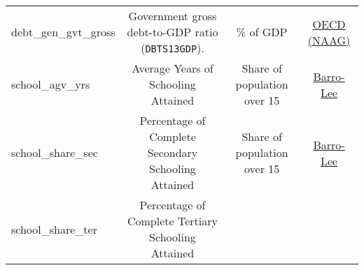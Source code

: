\documentclass[]{article}
\begin{document}
\begin{longtable}[]{@{}lccc@{}}
\begin{minipage}[t]{0.14\columnwidth}
debt\_gen\_gvt\_gross\strut
\end{minipage} & \begin{minipage}[t]{0.36\columnwidth}\centering\strut
Government gross debt-to-GDP ratio (\texttt{DBTS13GDP}).\strut
\end{minipage} & \begin{minipage}[t]{0.24\columnwidth}\centering\strut
\% of GDP\strut
\end{minipage} & \begin{minipage}[t]{0.15\columnwidth}\centering\strut
\href{https://stats.oecd.org/Index.aspx?DataSetCode=NAAG}{OECD
(NAAG)}\strut
\end{minipage}\tabularnewline
\begin{minipage}[t]{0.14\columnwidth}\raggedright\strut
school\_agv\_yrs\strut
\end{minipage} & \begin{minipage}[t]{0.36\columnwidth}\centering\strut
Average Years of Schooling Attained\strut
\end{minipage} & \begin{minipage}[t]{0.24\columnwidth}\centering\strut
Share of population over 15\strut
\end{minipage} & \begin{minipage}[t]{0.15\columnwidth}\centering\strut
\href{http://www.barrolee.com/}{Barro-Lee}\strut
\end{minipage}\tabularnewline
\begin{minipage}[t]{0.14\columnwidth}\raggedright\strut
school\_share\_sec\strut
\end{minipage} & \begin{minipage}[t]{0.36\columnwidth}\centering\strut
Percentage of Complete Secondary Schooling Attained\strut
\end{minipage} & \begin{minipage}[t]{0.24\columnwidth}\centering\strut
Share of population over 15\strut
\end{minipage} & \begin{minipage}[t]{0.15\columnwidth}\centering\strut
\href{http://www.barrolee.com/}{Barro-Lee}\strut
\end{minipage}\tabularnewline
\begin{minipage}[t]{0.14\columnwidth}\raggedright\strut
school\_share\_ter\strut
\end{minipage} & \begin{minipage}[t]{0.36\columnwidth}\centering\strut
Percentage of Complete Tertiary Schooling Attained\strut
\end{minipage} & \begin{minipage}[t]{0.24\columnwidth}\centering\strut

\end{minipage}
\end{longtable}
\end{document}
